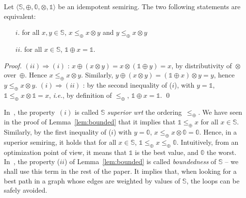 \documentclass[runningheads]{llncs}
\def\ie{\textit{i.e.}\xspace}
\def\wrt{\textit{wrt}\xspace}
\def\<#1>{\langle #1 \rangle}
\newcommand{\Semiring}{\mathbb{S}}
\newcommand{\zero}{\mathbb{0}}
\newcommand{\one}{\mathbb{1}}
\newcommand{\dom}{\ensuremath{\mathit{dom}}}
\begin{document}
\begin{lemma}
\label{lem:superior}\label{lem:bounded}
Let $\< \Semiring, \oplus, \zero, \otimes, \one>$ be an idempotent semiring.
The two following statements are equivalent:
\begin{itemize}
\item [$i.$] for all $x, y \in \Semiring$,  
$x \leq_\oplus x \otimes y$ and 
$y \leq_\oplus x \otimes y$
\item[$ii.$] for all $x \in \Semiring$,  $\one \oplus x = \one$.
\end{itemize}
\end{lemma}
%
\begin{proof} %
$(ii) \Rightarrow (i)$ : 
$x \oplus (x \otimes y) = x \otimes (\one \oplus y) = x$, 
by distributivity of~$\otimes$ over~$\oplus$. 
Hence $x \leq_\oplus x \otimes y$.
Similarly, $y \oplus (x \otimes y) = (\one \oplus x) \otimes y = y$, 
hence $y \leq_\oplus x \otimes y$.
%
$(i) \Rightarrow (ii)$ :
by the second inequality of ($i$), with $y = \one$, 
$\one \leq_\oplus x \otimes \one = x$, \ie, 
by definition of $\leq_\oplus$, $\one \oplus x = \one$.
\qed
\end{proof}

In~\cite{Huang08advanceddynamic}, the property~$(i)$ 
is called $\Semiring$ \emph{superior} \wrt the ordering~$\leq_\oplus$.
We have seen in the proof of Lemma~\ref{lem:bounded} that it implies that 
$\one \leq_\oplus x$ for all $x \in \Semiring$.
Similarly, by the first inequality of ($i$) with $y = \zero$,  
$x \leq_\oplus x \otimes \zero = \zero$.
%
Hence, in a superior semiring, %
it holds that %
for all $x \in \Semiring$, $\one \leq_\oplus x \leq_\oplus \zero$.
%
Intuitively, from an optimization point of view,
it means that $\one$ is the best value, and $\zero$ the worst.
%
In~\cite{Mohri02semiring}, the property ($ii$) of Lemma~\ref{lem:bounded}  
is called \emph{boundedness} of $\Semiring$ -- we shall use this term in the rest of the paper. 
It implies that, when looking for a best path in a graph whose edges
are weighted by values of $\Semiring$, the loops can be safely avoided.


\end{document}
